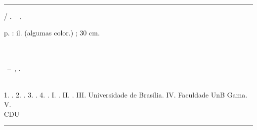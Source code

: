 \begin{fichacatalografica}
	\vspace*{\fill}					%
	\hrule							%
	\begin{center}					%
	\begin{minipage}[c]{12.5cm}		%

	\imprimirautor

	\hspace{0.5cm} \imprimirtitulo  / \imprimirautor. --
	\imprimirlocal, \imprimirdata-

	\hspace{0.5cm} \pageref{LastPage} p. : il. (algumas color.) ; 30 cm.\\

	\hspace{0.5cm} \imprimirorientadorRotulo~\imprimirorientador\\
	
	\hspace{0.5cm} \imprimircoorientadorRotulo~\imprimircoorientador\\

	\hspace{0.5cm}
	\parbox[t]{\textwidth}{\imprimirtipotrabalho~--~\imprimirinstituicao,
	\imprimirdata.}\\

	\hspace{0.5cm}
		1. \imprimirpalavrachaveum.
		2. \imprimirpalavrachavedois.
		3. \imprimirpalavrachavetres.
		4. \imprimirpalavrachavequatro.
		I. \imprimirorientador.
		II. \imprimircoorientador.
		III. Universidade de Brasília.
		IV. Faculdade UnB Gama.
		V. \imprimirtitulo\\

	\hspace{8.75cm} CDU \nomecdu\\

	\end{minipage}
	\end{center}
	\hrule
\end{fichacatalografica}
